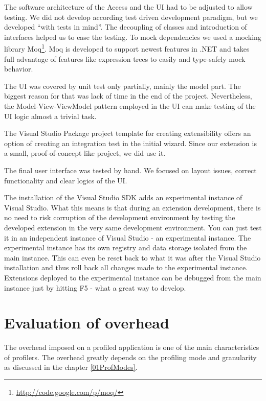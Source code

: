 The software architecture of the Access and the UI had to be adjusted to allow testing. We did not develop according test driven development paradigm, but we developed ``with tests in mind''. The decoupling of classes and introduction of interfaces helped us to ease the testing. To mock dependencies we used a mocking library Moq\footnote{ \href{http://code.google.com/p/moq/}{http://code.google.com/p/moq/}}. Moq is developed to support newest features in .NET and takes full advantage of features like expression trees to easily and type-safely mock behavior. 

The UI was covered by unit test only partially, mainly the model part. The biggest reason for that was lack of time in the end of the project. Nevertheless, the Model-View-ViewModel pattern employed in the UI can make testing of the UI logic almost a trivial task. 

The Visual Studio Package project template for creating extensibility offers an option of creating an integration test in the initial wizard. Since our extension is a small, proof-of-concept like project, we did use it. 

The final user interface was tested by hand. We focused on layout issues, correct functionality and clear logics of the UI.

The installation of the Visual Studio SDK adds an experimental instance of Visual Studio. What this means is that during an extension development, there is no need to risk corruption of the development environment by testing the developed extension in the very same development environment. You can just test it in an independent instance of Visual Studio - an experimental instance. The experimental instance has its own registry and data storage isolated from the main instance. This can even be reset back to what it was after the Visual Studio installation and thus roll back all changes made to the experimental instance. Extensions deployed to the experimental instance can be debugged from the main instance just by hitting F5 - what a great way to develop. 



\section{Evaluation of overhead}
The overhead imposed on a profiled application is one of the main characteristics of profilers. The overhead greatly depends on the profiling mode and granularity as discussed in the chapter \ref{01ProfModes}.

